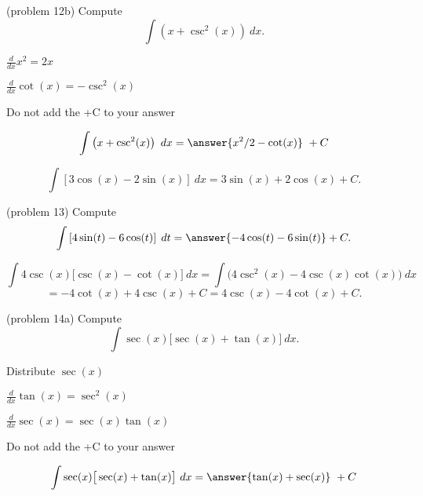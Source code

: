 \documentclass[handout]{ximera}
\begin{document}
\begin{problem}(problem 12b)
Compute
\[
\int \left(x + \csc^2(x) \right) \ dx.
\]

\begin{hint}
$\frac{d}{dx} x^2 = 2x$
\end{hint}
\begin{hint}
$\frac{d}{dx} \cot(x) = -\csc^2(x)$
\end{hint}
\begin{hint}
\begin{center}
Do not add the +C to your answer
\end{center}
\end{hint}

\[
\int \left(x + \csc^2(x) \right) \ dx =
\answer{x^2 /2 - \cot(x)} \ +  C
\]
\end{problem}



\begin{example}[example 13]
\[
\int \left[3\cos(x) - 2\sin(x)\right] \ dx = 3\sin(x) + 2\cos(x) + C.
\]
\end{example}


\begin{problem}(problem 13)
Compute
\[
\int \left[4\sin(t) - 6\cos(t)\right] \; dt = \answer{-4\cos(t) - 6\sin(t)} + C.
\]
\end{problem}

\begin{example}[example 14]
\[
\int 4\csc(x)\big[\csc(x) - \cot(x)\big] \ dx = \int \big(4\csc^2(x)  - 4\csc(x)\cot(x)\big) \ dx
\]
\[
 = -4\cot(x) + 4\csc(x) + C
= 4\csc(x) - 4 \cot(x) + C.
\]
\end{example}



\begin{problem}(problem 14a)
Compute
\[
\int \sec(x)\big[\sec(x) + \tan(x) \big] \ dx.
\]

\begin{hint}
Distribute $\sec(x)$
\end{hint}
\begin{hint}
$\frac{d}{dx} \tan(x) = \sec^2(x)$
\end{hint}
\begin{hint}
$\frac{d}{dx} \sec(x) = \sec(x)\tan(x)$
\end{hint}
\begin{hint}
\begin{center}
Do not add the +C to your answer
\end{center}
\end{hint}

\[
\int \sec(x)\big[\sec(x) + \tan(x) \big] \ dx =
\answer{\tan(x) + \sec(x)} \ +  C
\]
\end{problem}
\end{document}
